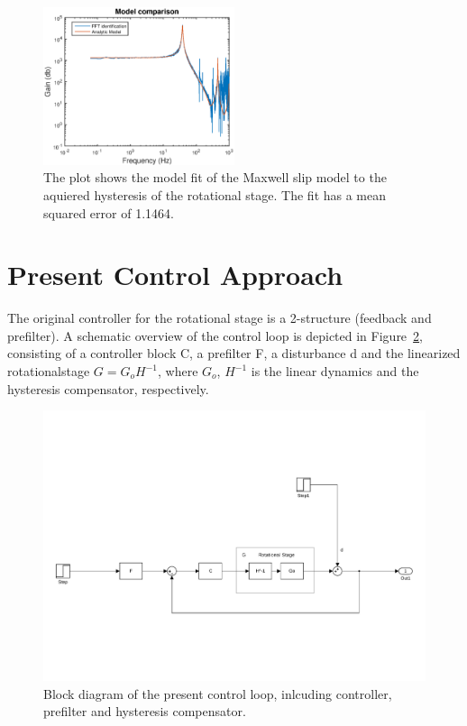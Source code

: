 \begin{figure}[h]
  \centering
  \includegraphics[width=0.5\textwidth]{fig/matlab/model.eps}
  \caption{\label{fig:model} The plot shows the model fit of the Maxwell slip model to the aquiered hysteresis of the rotational stage. The fit has a mean squared error of 1.1464.}
\end{figure}


\section{Present Control Approach}
The original controller for the rotational stage is a 2-\abbrDOF structure (feedback and prefilter). A schematic overview of the control loop is depicted in Figure~\ref{fig:present}, consisting of a controller block C, a prefilter F, a disturbance d and the linearized rotationalstage $G =G_oH^{-1}$, where $G_o$, $H^{-1}$ is the linear dynamics and the hysteresis compensator, respectively.

\begin{figure}[h]
  \centering %
  \includegraphics[width=1\textwidth, trim=4cm 3cm 2.1cm 10cm, clip=true]{fig/matlab/present_controller}
  \caption{\label{fig:present}Block diagram of the present control loop, inlcuding controller, prefilter and hysteresis compensator.}
\end{figure}

